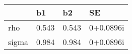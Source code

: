 \begin{tabular}{llll}
\hline 
  & b1 & b2 & SE \\ 
\hline 
rho & 0.543 & 0.543 & 0+0.0896i \\ 
sigma & 0.984 & 0.984 & 0+0.0896i \\ 
\hline 
\end{tabular}